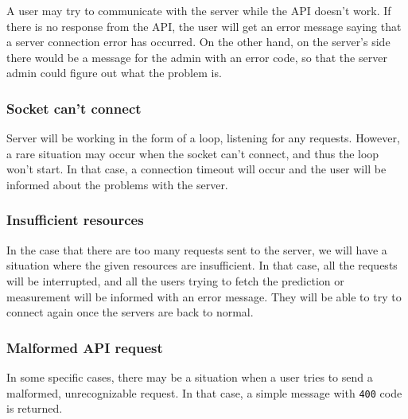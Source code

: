 \documentclass[titlepage]{article}
\begin{document}
A user may try to communicate with the server while the API doesn't work. If there is no response from the API, the user will get an error message saying that a server connection error has occurred. On the other hand, on the server's side there would be a message for the admin with an error code, so that the server admin could figure out what the problem is.

\subsubsection{Socket can't connect}

Server will be working in the form of a loop, listening for any requests. However, a rare situation may occur when the socket can't connect, and thus the loop won't start. In that case, a connection timeout will occur and the user will be informed about the problems with the server.

\subsubsection{Insufficient resources}

In the case that there are too many requests sent to the server, we will have a situation where the given resources are insufficient. In that case, all the requests will be interrupted, and all the users trying to fetch the prediction or measurement will be informed with an error message. They will be able to try to connect again once the servers are back to normal.

\subsubsection{Malformed API request}

In some specific cases, there may be a situation when a user tries to send a malformed, unrecognizable request. In that case, a simple message with \texttt{400} code is returned.
\end{document}
